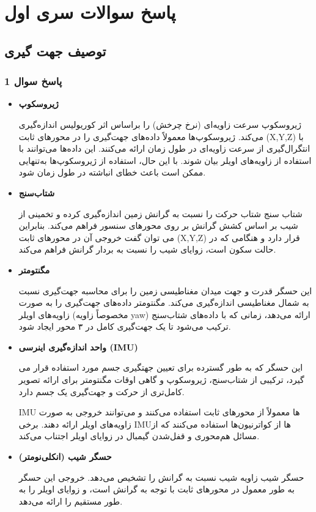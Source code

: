 
\chapter{پاسخ سوالات سری اول}

\section{توصیف جهت گیری}

\subsection{ پاسخ سوال 1}
\begin{itemize}
	\item 
\textbf{ژیروسکوپ}

ژیروسکوپ سرعت زاویه‌ای (نرخ چرخش) را براساس اثر کوریولیس اندازه‌گیری می‌کند.
ژیروسکوپ‌ها معمولاً داده‌های جهت‌گیری را در محورهای ثابت
 (X,Y,Z) 
با انتگرال‌گیری از سرعت زاویه‌ای در طول زمان ارائه می‌کنند. این داده‌ها می‌توانند با استفاده از زاویه‌های اویلر بیان شوند. با این حال، استفاده از ژیروسکوپ‌ها به‌تنهایی ممکن است باعث خطای انباشته در طول زمان شود.
\item 
\textbf{شتاب‌سنج}

شتاب سنج شتاب حرکت را نسبت به گرانش زمین اندازه‌گیری کرده و تخمینی از شیب بر اساس کشش گرانش بر روی محورهای سنسور فراهم می‌کند. بنابراین می توان گفت خروجی آن در محورهای ثابت (X,Y,Z) قرار دارد و هنگامی که در حالت سکون است، زوایای شیب را نسبت به بردار گرانش فراهم می‌کند.
\item 
\textbf{مگنتومتر}

این حسگر قدرت و جهت میدان مغناطیسی زمین را برای محاسبه جهت‌گیری نسبت به شمال مغناطیسی اندازه‌گیری می‌کند.
مگنتومتر داده‌های جهت‌گیری را به صورت زاویه‌های اویلر (مخصوصاً زاویه yaw) ارائه می‌دهد، زمانی که با داده‌های شتاب‌سنج ترکیب می‌شود تا یک جهت‌گیری کامل در ۳ محور ایجاد شود.
\item 
\textbf{واحد اندازه‌گیری اینرسی (IMU)}

این حسگر که به طور گسترده برای تعیین جهتگیری جسم مورد استفاده قرار می گیرد، ترکیبی از شتاب‌سنج، ژیروسکوپ و گاهی اوقات مگنتومتر برای ارائه تصویر کامل‌تری از حرکت و جهت‌گیری یک جسم دارد.

 IMU
 ها معمولاً از محورهای ثابت استفاده می‌کنند و می‌توانند خروجی به صورت زاویه‌های اویلر ارائه دهند. برخی IMUها از کواترنیون‌ها استفاده می‌کنند که از مسائل هم‌محوری و قفل‌شدن گیمبال در زوایای اویلر اجتناب می‌کند.

\item 

\textbf{حسگر شیب (انکلی‌نومتر)}

حسگر شیب زاویه شیب نسبت به گرانش را تشخیص می‌دهد.
خروجی این حسگر به طور معمول در محورهای ثابت با توجه به گرانش است، و زوایای اویلر را به طور مستقیم را ارائه می‌دهد.

\end{itemize}
